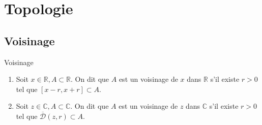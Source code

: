 \documentclass[12pt,a4paper]{report}
\begin{document}
\chapter{Topologie}

\section{Voisinage}

\begin{definition}{Voisinage}{}
\begin{enumerate}
\item Soit $x \in \mathbb{R}, A \subset \mathbb{R}$. On dit que $A$ est un voisinage de $x$ dans $\mathbb{R}$ s'il existe $r>0$ tel que $\left[x-r,x+r\right] \subset A$.
\item Soit $z \in \mathbb{C}, A \subset \mathbb{C}$. On dit que $A$ est un voisinage de $z$ dans $\mathbb{C}$ s'il existe $r>0$ tel que $\overline{\mathcal{D}}(z,r) \subset A$.
\end{enumerate}
\end{definition}
\end{document}
